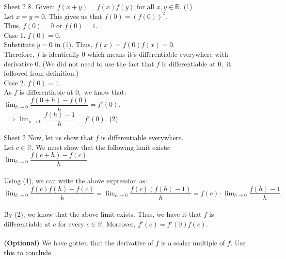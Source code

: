 \documentclass[handout, aspectratio=169]{beamer}
\begin{document}
\begin{frame}{Sheet 2}
	8. Given: $f(x + y) = f(x)f(y)$ for all $x, y \in \mathbb{R}.$ \hfill (1)\\
	Let $x = y = 0.$ This gives us that $f(0) = \left(f(0)\right)^2.$\\
	Thus, $f(0) = 0$ or $f(0) = 1.$\\
	Case 1. $f(0) = 0.$\\
	Substitute $y = 0$ in (1). Thus, $f(x) = f(0)f(x) = 0.$\\
	Therefore, $f$ is identically $0$ which means it's differentiable everywhere with derivative $0.$ (We did not need to use the fact that $f$ is differentiable at $0,$ it followed from definition.)\\
	Case 2. $f(0) = 1.$\\
	As $f$ is differentiable at $0,$ we know that:\\
	$\displaystyle\lim_{h\to 0}\dfrac{f(0+h) - f(0)}{h} = f'(0).$\\
	$\implies \displaystyle\lim_{h\to 0}\dfrac{f(h) - 1}{h} = f'(0).$ \hfill (2)\\
\end{frame}
\begin{frame}{Sheet 2}
	Now, let us show that $f$ is differentiable everywhere.\\
	Let $c \in \mathbb{R}.$ We must show that the following limit exists:\\
	$\displaystyle\lim_{h\to 0}\dfrac{f(c + h) - f(c)}{h}$\\~\\
	Using (1), we can write the above expression as:\\
	$\displaystyle\lim_{h\to 0}\dfrac{f(c)f(h) - f(c)}{h} = \lim_{h\to 0}\dfrac{f(c)(f(h) - 1)}{h} = f(c)\cdot\lim_{h\to 0}\dfrac{f(h) - 1}{h}.$\\~\\
	By (2), we know that the above limit exists. Thus, we have it that $f$ is differentiable at $c$ for every $c \in \mathbb{R}.$ Moreover, $f'(c) = f'(0)f(c).$\\~\\
	\textbf{(Optional)} We have gotten that the derivative of $f$ is a scalar multiple of $f.$ Use this to conclude.	
\end{frame}
\end{document}
